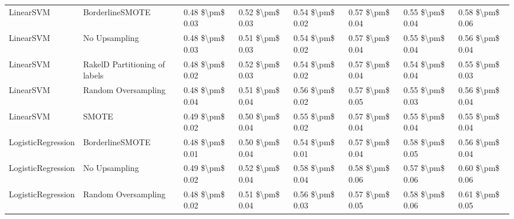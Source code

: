 \begin{tabular}{llllllll}
                      LinearSVM &               BorderlineSMOTE & 0.48 \$\textbackslash pm\$ 0.03 &           0.52 \$\textbackslash pm\$ 0.03 &       0.54 \$\textbackslash pm\$ 0.02 &        0.57 \$\textbackslash pm\$ 0.04 &                         0.55 \$\textbackslash pm\$ 0.04 &     0.58 \$\textbackslash pm\$ 0.06 \\
                      LinearSVM &                 No Upsampling & 0.48 \$\textbackslash pm\$ 0.03 &           0.51 \$\textbackslash pm\$ 0.03 &       0.54 \$\textbackslash pm\$ 0.02 &        0.57 \$\textbackslash pm\$ 0.04 &                         0.55 \$\textbackslash pm\$ 0.04 &     0.56 \$\textbackslash pm\$ 0.04 \\
                      LinearSVM & RakelD Partitioning of labels & 0.48 \$\textbackslash pm\$ 0.02 &           0.52 \$\textbackslash pm\$ 0.03 &       0.54 \$\textbackslash pm\$ 0.02 &        0.57 \$\textbackslash pm\$ 0.04 &                         0.54 \$\textbackslash pm\$ 0.04 &     0.55 \$\textbackslash pm\$ 0.03 \\
                      LinearSVM &           Random Oversampling & 0.48 \$\textbackslash pm\$ 0.04 &           0.51 \$\textbackslash pm\$ 0.04 &       0.56 \$\textbackslash pm\$ 0.02 &        0.57 \$\textbackslash pm\$ 0.05 &                         0.55 \$\textbackslash pm\$ 0.03 &     0.56 \$\textbackslash pm\$ 0.04 \\
                      LinearSVM &                         SMOTE & 0.49 \$\textbackslash pm\$ 0.02 &           0.50 \$\textbackslash pm\$ 0.04 &       0.55 \$\textbackslash pm\$ 0.02 &        0.57 \$\textbackslash pm\$ 0.04 &                         0.55 \$\textbackslash pm\$ 0.04 &     0.55 \$\textbackslash pm\$ 0.04 \\
             LogisticRegression &               BorderlineSMOTE & 0.48 \$\textbackslash pm\$ 0.01 &           0.50 \$\textbackslash pm\$ 0.04 &       0.54 \$\textbackslash pm\$ 0.01 &        0.57 \$\textbackslash pm\$ 0.04 &                         0.58 \$\textbackslash pm\$ 0.05 &     0.56 \$\textbackslash pm\$ 0.04 \\
             LogisticRegression &                 No Upsampling & 0.49 \$\textbackslash pm\$ 0.02 &           0.52 \$\textbackslash pm\$ 0.04 &       0.58 \$\textbackslash pm\$ 0.04 &        0.58 \$\textbackslash pm\$ 0.06 &                         0.57 \$\textbackslash pm\$ 0.06 &     0.60 \$\textbackslash pm\$ 0.06 \\
             LogisticRegression &           Random Oversampling & 0.48 \$\textbackslash pm\$ 0.02 &           0.51 \$\textbackslash pm\$ 0.04 &       0.56 \$\textbackslash pm\$ 0.03 &        0.57 \$\textbackslash pm\$ 0.05 &                         0.58 \$\textbackslash pm\$ 0.06 &     0.61 \$\textbackslash pm\$ 0.05 \\

\end{tabular}
